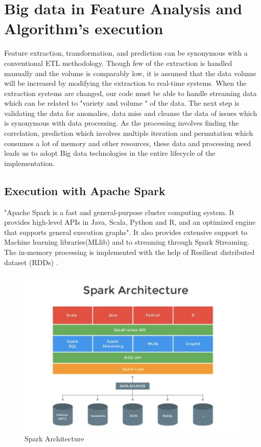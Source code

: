 \documentclass[sigconf]{acmart}
\begin{document}
\section{Big data in Feature Analysis and Algorithm's execution}
Feature extraction, transformation, and prediction can be synonymous with a conventional ETL methodology. Though few of the extraction is handled manually and the volume is comparably low, it is assumed that the data volume will be increased by modifying the extraction to real-time systems. When the extraction systems are changed, our code must be able to handle streaming data which can be related to "variety and volume " of the data. The next step is validating the data for anomalies, data miss and cleanse the data of issues which is synonymous with data processing. As the processing involves finding the correlation, prediction which involves multiple iteration and permutation which consumes a lot of memory and other resources, these data and processing need leads us to adopt Big data technologies in the entire lifecycle of the implementation.

\subsection{Execution with Apache Spark}
"Apache Spark is a fast and general-purpose cluster computing system. It provides high-level APIs in Java, Scala, Python and R, and an optimized engine that supports general execution graphs". It also provides extensive support to Machine learning libraries(MLlib) and to streaming through Spark Streaming. The in-memory processing is implemented with the help of Resilient distributed dataset (RDDs) \cite{5:online}.


\begin{figure}[!ht]
  \centering\includegraphics[width=\columnwidth]{PROJECT/images/Sparkarchic.png}
  \caption{Spark Architecture}
\end{figure}
\end{document}
